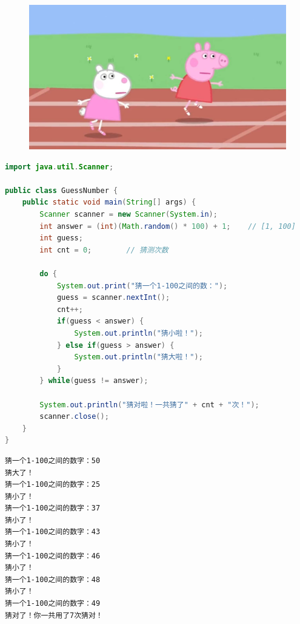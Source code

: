 \begin{figure}[H]
	\centering
	\includegraphics[scale=0.15]{img/C4/4-3/1.png}
\end{figure}


\begin{lstlisting}[language=Java]
import java.util.Scanner;

public class GuessNumber {
    public static void main(String[] args) {
        Scanner scanner = new Scanner(System.in);
        int answer = (int)(Math.random() * 100) + 1;    // [1, 100]
        int guess;
        int cnt = 0;        // 猜测次数
        
        do {
            System.out.print("猜一个1-100之间的数：");
            guess = scanner.nextInt();
            cnt++;
            if(guess < answer) {
                System.out.println("猜小啦！");
            } else if(guess > answer) {
                System.out.println("猜大啦！");
            }
        } while(guess != answer);
        
        System.out.println("猜对啦！一共猜了" + cnt + "次！");
        scanner.close();
    }
}
\end{lstlisting}

\begin{tcolorbox}
\begin{verbatim}
猜一个1-100之间的数字：50
猜大了！
猜一个1-100之间的数字：25
猜小了！
猜一个1-100之间的数字：37
猜小了！
猜一个1-100之间的数字：43
猜小了！
猜一个1-100之间的数字：46
猜小了！
猜一个1-100之间的数字：48
猜小了！
猜一个1-100之间的数字：49
猜对了！你一共用了7次猜对！
\end{verbatim}
\end{tcolorbox}

\newpage

